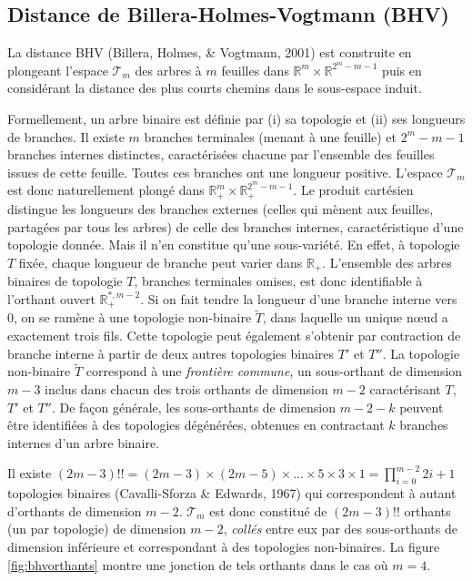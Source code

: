 \documentclass[12pt,a4paper]{reedthesis}
\newcommand \RR {\mathbb{R}}
\theoremstyle{definition}
\theoremstyle{definition}
\theoremstyle{definition}
\theoremstyle{remark}
\begin{document}
\hypertarget{distance-de-billera-holmes-vogtmann-bhv}{%
\subsection{Distance de Billera-Holmes-Vogtmann (BHV)}\label{distance-de-billera-holmes-vogtmann-bhv}}

La distance BHV (Billera, Holmes, \& Vogtmann, 2001) est construite en plongeant l'espace \(\mathscr{T}_m\) des arbres à \(m\) feuilles dans \(\RR^m \times \RR^{2^{m}-m-1}\) puis en considérant la distance des plus courts chemins dans le sous-espace induit.

Formellement, un arbre binaire est définie par (i) sa topologie et (ii) ses longueurs de branches. Il existe \(m\) branches terminales (menant à une feuille) et \(2^{m} - m - 1\) branches internes distinctes, caractérisées chacune par l'ensemble des feuilles issues de cette feuille. Toutes ces branches ont une longueur positive. L'espace \(\mathscr{T}_m\) est donc naturellement plongé dans \(\RR_+^m \times \RR_+^{2^{m}-m-1}\). Le produit cartésien distingue les longueurs des branches externes (celles qui mènent aux feuilles, partagées par tous les arbres) de celle des branches internes, caractéristique d'une topologie donnée. Mais il n'en constitue qu'une sous-variété. En effet, à topologie \(T\) fixée, chaque longueur de branche peut varier dans \(\RR_+\). L'ensemble des arbres binaires de topologie \(T\), branches terminales omises, est donc identifiable à l'orthant ouvert \(\RR_+^{*, m-2}\). Si on fait tendre la longueur d'une branche interne vers \(0\), on se ramène à une topologie non-binaire \(\tilde{T}\), dans laquelle un unique nœud a exactement trois fils. Cette topologie peut également s'obtenir par contraction de branche interne à partir de deux autres topologies binaires \(T'\) et \(T''\). La topologie non-binaire \(\tilde{T}\) correspond à une \emph{frontière commune}, un sous-orthant de dimension \(m-3\) inclus dans chacun des trois orthants de dimension \(m-2\) caractérisant \(T\), \(T'\) et \(T''\). De façon générale, les sous-orthants de dimension \(m - 2 - k\) peuvent être identifiées à des topologies dégénérées, obtenues en contractant \(k\) branches internes d'un arbre binaire.

Il existe \((2m-3)!! = (2m-3)\times(2m-5)\times\dots\times5 \times 3 \times 1 = \prod_{i = 0}^{m-2} 2i+1\) topologies binaires (Cavalli-Sforza \& Edwards, 1967) qui correspondent à autant d'orthants de dimension \(m-2\). \(\mathscr{T}_m\) est donc constitué de \((2m-3)!!\) orthants (un par topologie) de dimension \(m-2\), \emph{collés} entre eux par des sous-orthants de dimension inférieure et correspondant à des topologies non-binaires. La figure \ref{fig:bhvorthants} montre une jonction de tels orthants dans le cas où \(m=4\).
\end{document}
